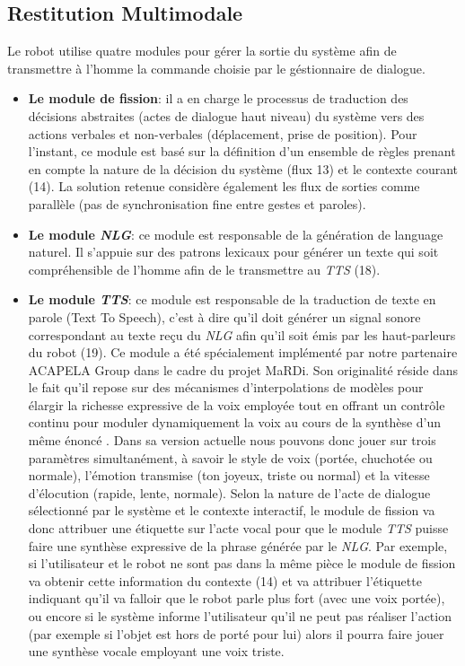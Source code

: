 \documentclass[a4paper,11pt,twoside]{StyleThese}
\begin{document}


\subsection{Restitution Multimodale}
Le robot utilise quatre modules pour gérer la sortie du système afin de transmettre à l'homme la commande choisie par le géstionnaire de dialogue.

\begin{itemize}
\item \textbf{Le module de fission}: il a en charge
le processus de traduction des décisions abstraites (actes de dialogue haut niveau) du système vers des actions verbales et non-verbales (déplacement, prise de position).
Pour l’instant, ce module est basé sur la définition d’un ensemble de règles prenant
en compte la nature de la décision du système (flux 13) et le contexte courant (14).
La solution retenue considère également les flux de sorties comme
parallèle (pas de synchronisation fine entre gestes et paroles).

\item \textbf{Le module \textit{NLG}}: ce module est responsable de la génération de language naturel. Il s'appuie sur des patrons lexicaux pour générer un texte qui soit compréhensible de l'homme afin de le transmettre au \textit{TTS} (18).

\item \textbf{Le module \textit{TTS}}: ce module est responsable de la traduction de texte en parole (Text To Speech), c'est à dire qu'il doit générer un signal sonore correspondant au texte reçu du \textit{NLG} afin qu'il soit émis par les haut-parleurs du robot (19). 
Ce module a été spécialement implémenté par
notre partenaire ACAPELA Group dans le cadre du projet MaRDi. Son originalité réside
dans le fait qu’il repose sur des mécanismes d’interpolations de modèles pour élargir la
richesse expressive de la voix employée tout en offrant un contrôle continu pour moduler
dynamiquement la voix au cours de la synthèse d’un même énoncé \cite{astrinaki2012}. Dans sa version actuelle nous pouvons donc jouer sur trois paramètres simultanément,
à savoir le style de voix (portée, chuchotée ou normale), l’émotion transmise
(ton joyeux, triste ou normal) et la vitesse d’élocution (rapide, lente, normale).
Selon la nature de l’acte de dialogue sélectionné par le système et le contexte interactif,
le module de fission va donc attribuer une étiquette sur l’acte vocal pour que le
module \textit{TTS} puisse faire une synthèse expressive de la phrase générée par le \textit{NLG}. Par
exemple, si l’utilisateur et le robot ne sont pas dans la même pièce le module de fission
va obtenir cette information du contexte (14) et va attribuer l’étiquette indiquant qu’il va falloir que le robot parle plus fort (avec
une voix portée), ou encore si le système informe l’utilisateur qu’il ne peut pas réaliser
l’action (par exemple si l’objet est hors de porté pour lui) alors il pourra faire jouer une
synthèse vocale employant une voix triste.



\end{itemize}
\end{document}

